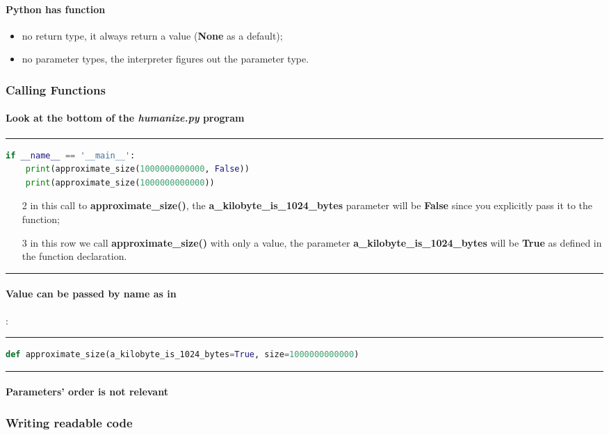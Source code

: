 \paragraph{Python has function}
\begin{itemize}
	\item no return type, it always return a value (\textbf{None} as a default); 
	\item no parameter types, the interpreter figures out the parameter type.
\end{itemize}	
\subsubsection{Calling Functions}
\paragraph{Look at the bottom of the \textit{humanize.py} program}
\hrule
\begin{lstlisting}[language=Python]
if __name__ == '__main__':
	print(approximate_size(1000000000000, False))
	print(approximate_size(1000000000000))
\end{lstlisting}
\begin{enumerate}
	\item[2] in this call to \textbf{approximate\_size()}, the \textbf{a\_kilobyte\_is\_1024\_bytes} parameter will be \textbf{False} since you explicitly pass it to the function;
	\item[3] in this row we call  \textbf{approximate\_size()} with only a value, the parameter \textbf{a\_kilobyte\_is\_1024\_bytes} will be \textbf{True} as defined in the function declaration.
\end{enumerate}
\hrule
\paragraph{Value can be passed by name as in}:
\hrule
\begin{lstlisting}[language=Python]
def approximate_size(a_kilobyte_is_1024_bytes=True, size=1000000000000)
\end{lstlisting}	
\hrule
\paragraph{Parameters' order is not relevant}
\subsubsection{Writing readable code}
